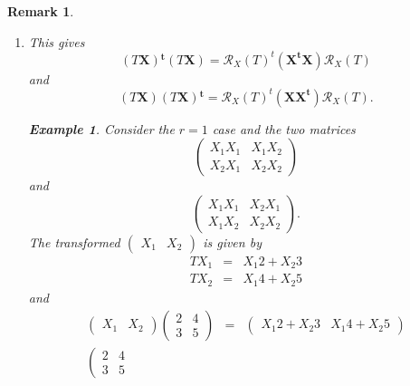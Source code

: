 \documentclass[aps,preprint]{revtex4}
\newtheorem{example}[theorem]{Example}
\newtheorem{remark}[theorem]{Remark}
\begin{document}
\begin{remark}
\begin{enumerate}
\item This gives 
\begin{equation}
\left( T\boldsymbol{X}\right) \boldsymbol{^{t}}\left( T\boldsymbol{X}\right)
=\mathcal{R}_{X}\left( T\right) ^{t}\left( \boldsymbol{X^{t}X}\right) 
\mathcal{R}_{X}\left( T\right)
\end{equation}%
and 
\begin{equation}
\left( T\boldsymbol{X}\right) \left( T\boldsymbol{X}\right) \boldsymbol{^{t}}%
=\mathcal{R}_{X}\left( T\right) ^{t}\left( \boldsymbol{XX^{t}}\right) 
\mathcal{R}_{X}\left( T\right) .
\end{equation}

\begin{example}
Consider the $r=1$ case and the two matrices 
\begin{equation}
\left( 
\begin{array}{cc}
X_{1}X_{1} & X_{1}X_{2} \\ 
X_{2}X_{1} & X_{2}X_{2}%
\end{array}%
\right)
\end{equation}%
and 
\begin{equation}
\left( 
\begin{array}{cc}
X_{1}X_{1} & X_{2}X_{1} \\ 
X_{1}X_{2} & X_{2}X_{2}%
\end{array}%
\right) .
\end{equation}%
The transformed $\left( 
\begin{array}{cc}
X_{1} & X_{2}%
\end{array}%
\right) $ is given by 
\begin{eqnarray}
TX_{1} &=&X_{1}2+X_{2}3 \\
TX_{2} &=&X_{1}4+X_{2}5
\end{eqnarray}%
and 
\begin{eqnarray}
\left( 
\begin{array}{cc}
X_{1} & X_{2}%
\end{array}%
\right) \left( 
\begin{array}{cc}
2 & 4 \\ 
3 & 5%
\end{array}%
\right) &=&\left( 
\begin{array}{cc}
X_{1}2+X_{2}3 & X_{1}4+X_{2}5%
\end{array}%
\right) \\
\left( 
\begin{array}{cc}
2 & 4 \\ 
3 & 5%
\end{array}%

\end{eqnarray}
\end{example}
\end{enumerate}
\end{remark}
\end{document}
